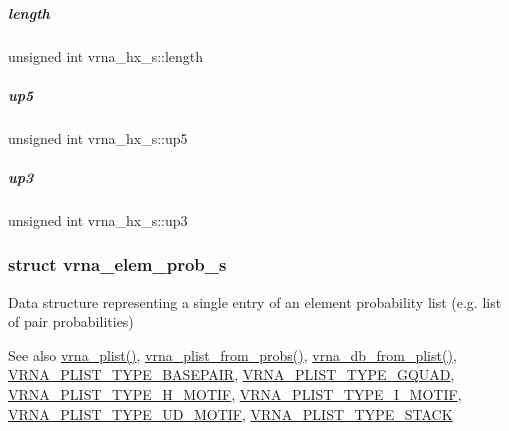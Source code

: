 \mbox{\label{group__struct__utils_a9184affd5dc5043f195e5c274c8e857f}} 
\subparagraph{\texorpdfstring{length}{length}}
{\footnotesize\ttfamily unsigned int vrna\+\_\+hx\+\_\+s\+::length}

\mbox{\label{group__struct__utils_a51a6a945dbc7f9443fb19a1af8126bb7}} 
\subparagraph{\texorpdfstring{up5}{up5}}
{\footnotesize\ttfamily unsigned int vrna\+\_\+hx\+\_\+s\+::up5}

\mbox{\label{group__struct__utils_ac2c0832c332d750ff1c87f63a01760bd}} 
\subparagraph{\texorpdfstring{up3}{up3}}
{\footnotesize\ttfamily unsigned int vrna\+\_\+hx\+\_\+s\+::up3}

\label{structvrna__elem__prob__s}
\subsubsection{struct vrna\+\_\+elem\+\_\+prob\+\_\+s}
Data structure representing a single entry of an element probability list (e.\+g. list of pair probabilities) 

\begin{DoxySeeAlso}{See also}
\mbox{\hyperlink{group__struct__utils_gaf002d69024d709744664a8b9ca3dd77d}{vrna\+\_\+plist()}}, \mbox{\hyperlink{group__pf__fold_ga94f6efc0b8d8712b023452794a0a5bd2}{vrna\+\_\+plist\+\_\+from\+\_\+probs()}}, \mbox{\hyperlink{group__struct__utils_ga6a51a36b9245d0bac868c5cd172b9611}{vrna\+\_\+db\+\_\+from\+\_\+plist()}}, \mbox{\hyperlink{group__struct__utils_ga7c7484a8a1e6704b1aefaf589f3b27c1}{V\+R\+N\+A\+\_\+\+P\+L\+I\+S\+T\+\_\+\+T\+Y\+P\+E\+\_\+\+B\+A\+S\+E\+P\+A\+IR}}, \mbox{\hyperlink{group__struct__utils_gac91ab79e9feede5347103949ecf04f8a}{V\+R\+N\+A\+\_\+\+P\+L\+I\+S\+T\+\_\+\+T\+Y\+P\+E\+\_\+\+G\+Q\+U\+AD}}, \mbox{\hyperlink{group__struct__utils_ga4d142e0187b8410b61ec2b168ed4513e}{V\+R\+N\+A\+\_\+\+P\+L\+I\+S\+T\+\_\+\+T\+Y\+P\+E\+\_\+\+H\+\_\+\+M\+O\+T\+IF}}, \mbox{\hyperlink{group__struct__utils_gadf5905518079b5495bce3394cd7afb9a}{V\+R\+N\+A\+\_\+\+P\+L\+I\+S\+T\+\_\+\+T\+Y\+P\+E\+\_\+\+I\+\_\+\+M\+O\+T\+IF}}, \mbox{\hyperlink{group__struct__utils_ga01d749cdb675dcdbac1dc5103378c699}{V\+R\+N\+A\+\_\+\+P\+L\+I\+S\+T\+\_\+\+T\+Y\+P\+E\+\_\+\+U\+D\+\_\+\+M\+O\+T\+IF}}, \mbox{\hyperlink{group__struct__utils_ga36df728a95452170ca8684fc224299ea}{V\+R\+N\+A\+\_\+\+P\+L\+I\+S\+T\+\_\+\+T\+Y\+P\+E\+\_\+\+S\+T\+A\+CK}} 
\end{DoxySeeAlso}
